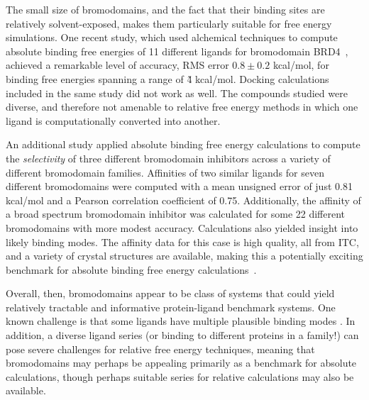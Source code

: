 \documentclass[aps,pre,twocolumn,nofootinbib,superscriptaddress,10pt, final,tightenlines]{revtex4-1}
\begin{document}
The small size of bromodomains, and the fact that their binding sites are relatively solvent-exposed,  makes them particularly suitable for free energy simulations.
One recent study, which used alchemical techniques to compute absolute binding free energies of 11 different ligands for bromodomain BRD4~\cite{aldeghi_accurate_2016}, achieved a remarkable level of accuracy, RMS error $0.8\pm0.2$ kcal/mol, for binding free energies spanning a range of \~4 kcal/mol.
Docking calculations included in the same study did not work as well.
The compounds studied were diverse, and therefore not amenable to relative free energy methods in which one ligand is computationally converted into another. 

An additional study applied absolute binding free energy calculations to compute the \emph{selectivity} of three different bromodomain inhibitors across a variety of different bromodomain families. 
Affinities of two similar ligands for seven different bromodomains were computed with a mean unsigned error of just 0.81 kcal/mol and a Pearson correlation coefficient of 0.75.
Additionally, the affinity of a broad spectrum bromodomain inhibitor was calculated for some 22 different bromodomains with more modest accuracy. 
Calculations also yielded insight into likely binding modes.
The affinity data for this case is high quality, all from ITC, and a variety of crystal structures are available, making this a potentially exciting benchmark for absolute binding free energy calculations~\cite{Aldeghi:2017:J.Am.Chem.Soc.}.


Overall, then, bromodomains appear to be class of systems that could yield relatively tractable and informative protein-ligand benchmark systems. 
One known challenge is that some ligands have multiple plausible binding modes \cite{aldeghi_accurate_2016, Aldeghi:2017:J.Am.Chem.Soc.}. 
In addition, a diverse ligand series (or binding to different proteins in a family!) can pose severe challenges for relative free energy techniques, meaning that bromodomains may perhaps be appealing primarily as a benchmark for absolute calculations, though perhaps suitable series for relative calculations may also be available.
\end{document}
